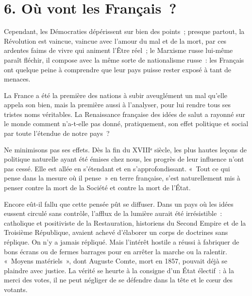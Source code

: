 \documentclass[french,twoside]{book} %
\begin{document}
\section[6. Où vont les Français ?]{6. Où vont les Français ?}
\noindent Cependant, les Démocraties dépérissent sur bien des points ; presque partout, la Révolution est vaincue, vaincue avec l’amour du mal et de la mort, par ces ardentes faims de vivre qui animent l’Être réel ; le Marxisme russe lui-même paraît fléchir, il compose avec la même sorte de nationalisme russe : les Français ont quelque peine à comprendre que leur pays puisse rester exposé à tant de menaces.\par
La France a été la première des nations à subir aveuglément un mal qu’elle appela son bien, mais la première aussi à l’analyser, pour lui rendre tous ses tristes noms véritables. La Renaissance française des idées de salut a rayonné sur le monde comment n’a-t-elle pas donné, pratiquement, son effet politique et social par toute l’étendue de notre pays ?\par
Ne minimisons pas ses effets. Dès la fin du XVIIIᵉ siècle, les plus hautes leçons de politique naturelle ayant été émises chez nous, les progrès de leur influence n’ont pas cessé. Elle est allée en s’étendant et en s’approfondissant. « Tout ce qui pense dans la mesure où il pense » en terre française, s’est naturellement mis à penser contre la mort de la Société et contre la mort de l’État.\par
Encore eût-il fallu que cette pensée pût se diffuser. Dans un pays où les idées eussent circulé sans contrôle, l’afflux de la lumière aurait été irrésistible : catholique et positiviste de la Restauration, historiens du Second Empire et de la Troisième République, avaient achevé d’élaborer un corps de doctrines sans réplique. On n’y a jamais répliqué. Mais l’intérêt hostile a réussi à fabriquer de bons écrans ou de fermes barrages pour en arrêter la marche ou la ralentir. « Moyens matériels », dont Auguste Comte, mort en 1857, pouvait déjà se plaindre avec justice. La vérité se heurte à la consigne d’un État électif : à la merci des votes, il ne peut négliger de se défendre dans la tête et le cœur des votants.\par
\end{document}
